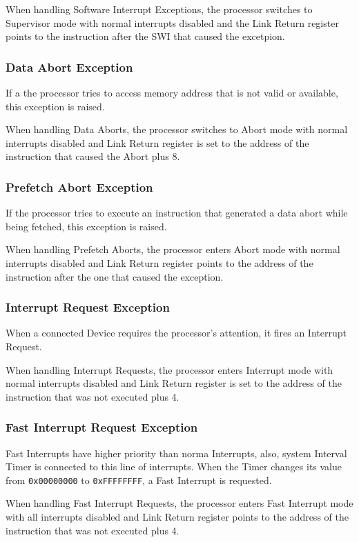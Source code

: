 When handling Software Interrupt Exceptions, the processor switches to Supervisor mode with normal interrupts disabled and the Link Return register points to the instruction after the SWI that caused the excetpion.

\subsubsection{Data Abort Exception}
If a the processor tries to access memory address that is not valid or available, this exception is raised.

When handling Data Aborts, the processor switches to Abort mode with normal interrupts disabled and Link Return register is set to the address of the instruction that caused the Abort plus 8.


\subsubsection{Prefetch Abort Exception}
If the processor tries to execute an instruction that generated a data abort while being fetched, this exception is raised.

When handling Prefetch Aborts, the processor enters Abort mode with normal interrupts disabled and Link Return register points to the address of the instruction after the one that caused the exception.

\subsubsection{Interrupt Request Exception}
When a connected Device requires the processor's attention, it fires an Interrupt Request.

When handling Interrupt Requests, the processor enters Interrupt mode with normal interrupts disabled and Link Return register is set to the address of the instruction that was not executed plus 4.

\subsubsection{Fast Interrupt Request Exception}
Fast Interrupts have higher priority than norma Interrupts, also, system Interval Timer is connected to this line of interrupts. When the Timer changes its value from \texttt{0x00000000} to \texttt{0xFFFFFFFF}, a Fast Interrupt is requested.

When handling Fast Interrupt Requests, the processor enters Fast Interrupt mode with all interrupts disabled and Link Return register points to the address of the instruction that was not executed plus 4.

